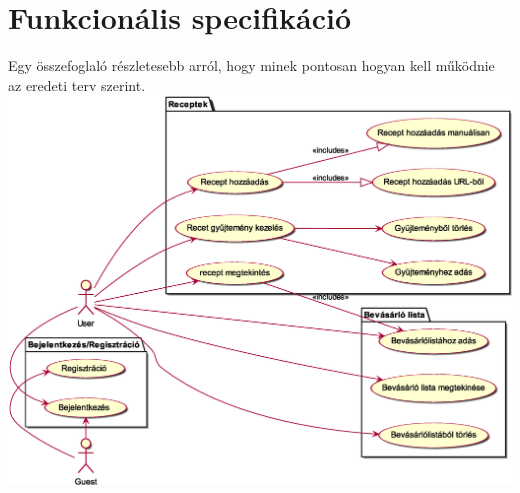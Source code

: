 \documentclass[12pt]{report}
\theoremstyle{definition}
\begin{document}

\chapter{Funkcionális specifikáció}
Egy összefoglaló részletesebb arról, hogy minek pontosan hogyan kell működnie az eredeti terv szerint. \\

\noindent
\includegraphics[width=\textwidth]{out/diagrams/useCase/use-case.eps}
\end{document}
